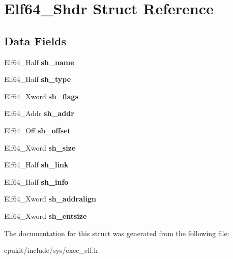 \hypertarget{structElf64__Shdr}{}\section{Elf64\+\_\+\+Shdr Struct Reference}
\label{structElf64__Shdr}
\subsection*{Data Fields}
\begin{DoxyCompactItemize}
\item 
\mbox{\label{structElf64__Shdr_a30858d17e9a90e32db063bb48189e380}} 
Elf64\+\_\+\+Half {\bfseries sh\+\_\+name}
\item 
\mbox{\label{structElf64__Shdr_a7eaceba83c7ec741185863dab3c5a864}} 
Elf64\+\_\+\+Half {\bfseries sh\+\_\+type}
\item 
\mbox{\label{structElf64__Shdr_a20aab677eb99c91c0e6c3c5dc8f0f3db}} 
Elf64\+\_\+\+Xword {\bfseries sh\+\_\+flags}
\item 
\mbox{\label{structElf64__Shdr_ac4ee2ceaec74ab5704ebba226e83b200}} 
Elf64\+\_\+\+Addr {\bfseries sh\+\_\+addr}
\item 
\mbox{\label{structElf64__Shdr_afd5e899b00b6527bbecf9cd4bda50112}} 
Elf64\+\_\+\+Off {\bfseries sh\+\_\+offset}
\item 
\mbox{\label{structElf64__Shdr_a8988fd6e383835e9d51344eddf38ef24}} 
Elf64\+\_\+\+Xword {\bfseries sh\+\_\+size}
\item 
\mbox{\label{structElf64__Shdr_ab92223a1967b38451026e38a39868ec9}} 
Elf64\+\_\+\+Half {\bfseries sh\+\_\+link}
\item 
\mbox{\label{structElf64__Shdr_a4aa8e6bb6221e171016cecd840a7a2ed}} 
Elf64\+\_\+\+Half {\bfseries sh\+\_\+info}
\item 
\mbox{\label{structElf64__Shdr_ab6b9f67208a04cc0d374203c0a3ab93a}} 
Elf64\+\_\+\+Xword {\bfseries sh\+\_\+addralign}
\item 
\mbox{\label{structElf64__Shdr_a879406e9ddf2bd7e45346d430d0aaa44}} 
Elf64\+\_\+\+Xword {\bfseries sh\+\_\+entsize}
\end{DoxyCompactItemize}


The documentation for this struct was generated from the following file\+:\begin{DoxyCompactItemize}
\item 
cpukit/include/sys/exec\+\_\+elf.\+h\end{DoxyCompactItemize}
